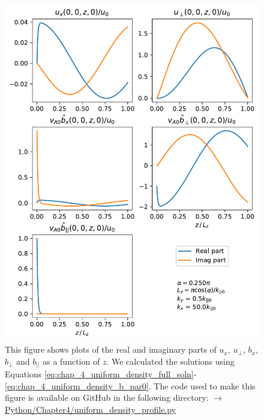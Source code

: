 \begin{figure}
    \centering
    \vspace{-20pt}
    \includegraphics[width=\textwidth,height=0.9\textheight,keepaspectratio]{figures/chapter04/uniform_density_profile.pdf}
    \vspace{-10pt}
    \caption{This figure shows plots of the real and imaginary parts of $u_x$, $u_\perp$, $b_x$, $b_\perp$ and $b_{||}$ as a function of $z$. We calculated the solutions using Equations \eqref{eq:chap_4_uniform_density_full_soln}-\eqref{eq:chap_4_uniform_density_b_par0}. The code used to make this figure is available on GitHub in the following directory:\newline
    \href{https://github.com/aleksyprok/apkp_thesis/blob/main/Python/Chapter4/uniform_density_profile.py}{$\rightarrow$ Python/Chapter4/uniform\_density\_profile.py}}
    \label{fig:uniform_density_profile}
    \vspace{-20pt}
\end{figure}


